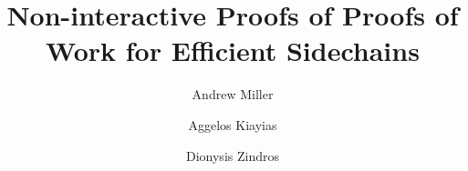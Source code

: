 \title{Non-interactive Proofs of Proofs of Work for Efficient Sidechains}
\author{Andrew Miller \and
        Aggelos Kiayias \and
        Dionysis Zindros}
\maketitle
